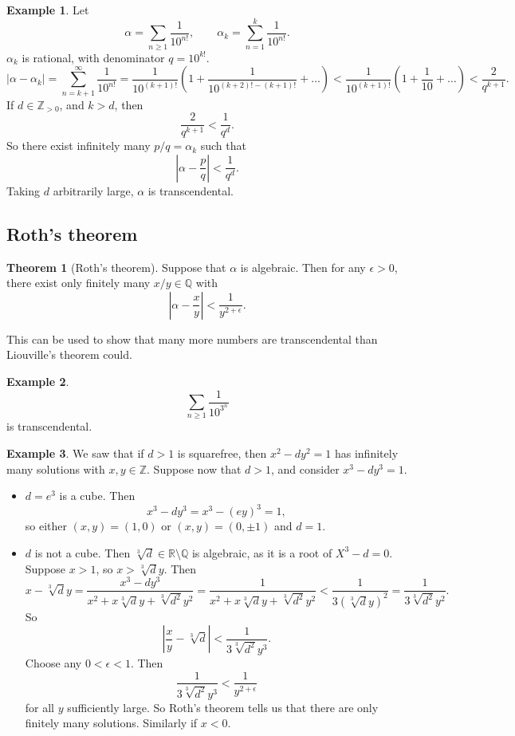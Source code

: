 \documentclass{article}
\newcommand{\Z}{\mathbb{Z}}
\newcommand{\Q}{\mathbb{Q}}
\newcommand{\R}{\mathbb{R}}
\newcommand{\rb}[1]{\left( #1 \right)}
\newcommand{\abs}[1]{\left\lvert #1 \right\rvert}
\theoremstyle{definition}\newtheorem{definition}{Definition}
\theoremstyle{definition}\newtheorem{remark}[definition]{Remark}
\theoremstyle{definition}\newtheorem*{example}{Example}
\theoremstyle{definition}\newtheorem*{note}{Note}
\newtheorem{theorem}[definition]{Theorem}
\begin{document}
\begin{example}
Let
$$ \alpha = \sum_{n \ge 1} \dfrac{1}{10^{n!}}, \qquad \alpha_k = \sum_{n = 1}^k \dfrac{1}{10^{n!}}. $$
$ \alpha_k $ is rational, with denominator $ q = 10^{k!} $.
$$ \abs{\alpha - \alpha_k} = \sum_{n = k + 1}^\infty \dfrac{1}{10^{n!}} = \dfrac{1}{10^{\rb{k + 1}!}}\rb{1 + \dfrac{1}{10^{\rb{k + 2}! - \rb{k + 1}!}} + \dots} < \dfrac{1}{10^{\rb{k + 1}!}}\rb{1 + \dfrac{1}{10} + \dots} < \dfrac{2}{q^{k + 1}}. $$
If $ d \in \Z_{> 0} $, and $ k > d $, then
$$ \dfrac{2}{q^{k + 1}} < \dfrac{1}{q^d}. $$
So there exist infinitely many $ p / q = \alpha_k $ such that
$$ \abs{\alpha - \dfrac{p}{q}} < \dfrac{1}{q^d}. $$
Taking $ d $ arbitrarily large, $ \alpha $ is transcendental.
\end{example}


\subsection{Roth's theorem}

\begin{theorem}[Roth's theorem]
Suppose that $ \alpha $ is algebraic. Then for any $ \epsilon > 0 $, there exist only finitely many $ x / y \in \Q $ with
$$ \abs{\alpha - \dfrac{x}{y}} < \dfrac{1}{y^{2 + \epsilon}}. $$
\end{theorem}

This can be used to show that many more numbers are transcendental than Liouville's theorem could.

\begin{example}
$$ \sum_{n \ge 1} \dfrac{1}{10^{3^n}} $$
is transcendental.
\end{example}

\begin{example}
We saw that if $ d > 1 $ is squarefree, then $ x^2 - dy^2 = 1 $ has infinitely many solutions with $ x, y \in \Z $. Suppose now that $ d > 1 $, and consider $ x^3 - dy^3 = 1 $.
\begin{itemize}
\item $ d = e^3 $ is a cube. Then
$$ x^3 - dy^3 = x^3 - \rb{ey}^3 = 1, $$
so either $ \rb{x, y} = \rb{1, 0} $ or $ \rb{x, y} = \rb{0, \pm1} $ and $ d = 1 $.
\item $ d $ is not a cube. Then $ \sqrt[3]{d} \in \R \setminus \Q $ is algebraic, as it is a root of $ X^3 - d = 0 $. Suppose $ x > 1 $, so $ x > \sqrt[3]{d}y $. Then
$$ x - \sqrt[3]{d}y = \dfrac{x^3 - dy^3}{x^2 + x\sqrt[3]{d}y + \sqrt[3]{d^2}y^2} = \dfrac{1}{x^2 + x\sqrt[3]{d}y + \sqrt[3]{d^2}y^2} < \dfrac{1}{3\rb{\sqrt[3]{d}y}^2} = \dfrac{1}{3\sqrt[3]{d^2}y^2}. $$
So
$$ \abs{\dfrac{x}{y} - \sqrt[3]{d}} < \dfrac{1}{3\sqrt[3]{d^2}y^3}. $$
Choose any $ 0 < \epsilon < 1 $. Then
$$ \dfrac{1}{3\sqrt[3]{d^2}y^3} < \dfrac{1}{y^{2 + \epsilon}} $$
for all $ y $ sufficiently large. So Roth's theorem tells us that there are only finitely many solutions. Similarly if $ x < 0 $.
\end{itemize}
\end{example}
\end{document}
